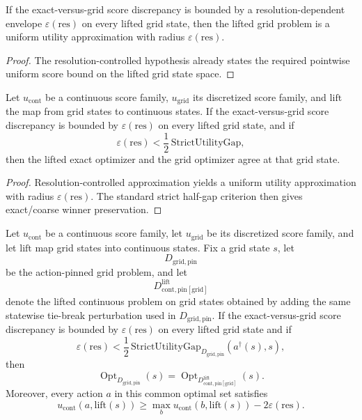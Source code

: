 \begin{theorem}\label{thm:resolution-controlled-uniform}
If the exact-versus-grid score discrepancy is bounded by a resolution-dependent envelope $\varepsilon(\mathrm{res})$ on every lifted grid state, then the lifted grid problem is a uniform utility approximation with radius $\varepsilon(\mathrm{res})$.
\end{theorem}

\begin{proof}
The resolution-controlled hypothesis already states the required pointwise uniform score bound on the lifted grid state space.
\end{proof}

\begin{theorem}\label{thm:resolution-controlled-gap-invariance}
Let $u_{\mathrm{cont}}$ be a continuous score family, $u_{\mathrm{grid}}$ its discretized score family, and $\mathrm{lift}$ the map from grid states to continuous states. If the exact-versus-grid score discrepancy is bounded by $\varepsilon(\mathrm{res})$ on every lifted grid state, and if
\[
\varepsilon(\mathrm{res}) < \frac{1}{2}\,\mathrm{StrictUtilityGap},
\]
then the lifted exact optimizer and the grid optimizer agree at that grid state.
\end{theorem}

\begin{proof}
Resolution-controlled approximation yields a uniform utility approximation with radius $\varepsilon(\mathrm{res})$. The standard strict half-gap criterion then gives exact/coarse winner preservation.
\end{proof}

\begin{theorem}\label{thm:action-pinned-lifting}
Let $u_{\mathrm{cont}}$ be a continuous score family, let $u_{\mathrm{grid}}$ be its discretized score family, and let $\mathrm{lift}$ map grid states into continuous states. Fix a grid state $s$, let
\[
  D_{\mathrm{grid,pin}}
\]
be the action-pinned grid problem, and let
\[
  D^{\mathrm{lift}}_{\mathrm{cont,pin}[\mathrm{grid}]}
\]
denote the lifted continuous problem on grid states obtained by adding the same statewise tie-break perturbation used in $D_{\mathrm{grid,pin}}$. If the exact-versus-grid score discrepancy is bounded by $\varepsilon(\mathrm{res})$ on every lifted grid state and if
\[
\varepsilon(\mathrm{res}) < \frac{1}{2}\,\mathrm{StrictUtilityGap}_{D_{\mathrm{grid,pin}}}(a^\dagger(s),s),
\]
then
\[
\operatorname{Opt}_{D_{\mathrm{grid,pin}}}(s)
=
\operatorname{Opt}_{D^{\mathrm{lift}}_{\mathrm{cont,pin}[\mathrm{grid}]}}(s).
\]
Moreover, every action $a$ in this common optimal set satisfies
\[
u_{\mathrm{cont}}(a,\mathrm{lift}(s))
\ge
\max_b u_{\mathrm{cont}}(b,\mathrm{lift}(s)) - 2\varepsilon(\mathrm{res}).
\]
\end{theorem}

